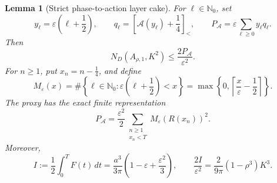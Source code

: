 \documentclass[11pt]{article}
\numberwithin{equation}{section}
\newtheorem{lemma}[theorem]{Lemma}
\theoremstyle{definition}
\theoremstyle{remark}
\begin{document}
\begin{lemma}[Strict phase-to-action layer cake]
\label{thin:lem-layer-cake}
For \(\ell\in\mathbb N_0\), set
\begin{equation}
  y_\ell=\varepsilon\left(\ell+\frac12\right),
  \qquad
  q_\ell=\left[\mathcal A(y_\ell)+\frac14\right]_<,
  \qquad
  P_{\mathcal A}=\varepsilon\sum_{\ell\geq0}y_\ell q_\ell.
  \label{thin:eq-phase-proxy}
\end{equation}
Then
\begin{equation}
  N_D(A_{\rho,1},K^2)
  \leq\frac{2P_{\mathcal A}}{\varepsilon^2}.
  \label{thin:eq-phase-transfer}
\end{equation}
For \(n\geq1\), put \(x_n=n-\tfrac14\), and define
\begin{equation}
  M_\varepsilon(x)
  =\#\left\{\ell\in\mathbb N_0:
       \varepsilon\left(\ell+\frac12\right)<x\right\}
  =\max\left\{0,
       \left\lceil\frac{x}{\varepsilon}-\frac12\right\rceil
       \right\}.
  \label{thin:eq-half-integer-count}
\end{equation}
The proxy has the exact finite representation
\begin{equation}
  P_{\mathcal A}
  =\frac{\varepsilon^2}{2}
    \sum_{\substack{n\geq1\\x_n<T}}
       M_\varepsilon(R(x_n))^2.
  \label{thin:eq-discrete-layer-cake}
\end{equation}
Moreover,
\begin{equation}
  I:=\frac12\int_0^T F(t)\,dt
  =\frac{a^3}{3\pi}
     \left(1-\varepsilon+\frac{\varepsilon^2}{3}\right),
  \qquad
  \frac{2I}{\varepsilon^2}
  =\frac{2}{9\pi}(1-\rho^3)K^3.
  \label{thin:eq-continuous-normalization}
\end{equation}
\end{lemma}
\end{document}
